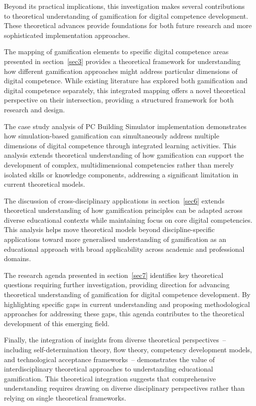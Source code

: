\documentclass[cte]{acnsart}
\begin{document}
Beyond its practical implications, this investigation makes several contributions to theoretical understanding of gamification for digital competence development. These theoretical advances provide foundations for both future research and more sophisticated implementation approaches.

The mapping of gamification elements to specific digital competence areas presented in section~\ref{sec3} provides a theoretical framework for understanding how different gamification approaches might address particular dimensions of digital competence. While existing literature has explored both gamification and digital competence separately, this integrated mapping offers a novel theoretical perspective on their intersection, providing a structured framework for both research and design.

The case study analysis of PC Building Simulator implementation demonstrates how simulation-based gamification can simultaneously address multiple dimensions of digital competence through integrated learning activities. This analysis extends theoretical understanding of how gamification can support the development of complex, multidimensional competencies rather than merely isolated skills or knowledge components, addressing a significant limitation in current theoretical models.

The discussion of cross-disciplinary applications in section~\ref{sec6} extends theoretical understanding of how gamification principles can be adapted across diverse educational contexts while maintaining focus on core digital competencies. This analysis helps move theoretical models beyond discipline-specific applications toward more generalised understanding of gamification as an educational approach with broad applicability across academic and professional domains.

The research agenda presented in section~\ref{sec7} identifies key theoretical questions requiring further investigation, providing direction for advancing theoretical understanding of gamification for digital competence development. By highlighting specific gaps in current understanding and proposing methodological approaches for addressing these gaps, this agenda contributes to the theoretical development of this emerging field.

Finally, the integration of insights from diverse theoretical perspectives~-- including self-determination theory, flow theory, competency development models, and technological acceptance frameworks~-- demonstrates the value of interdisciplinary theoretical approaches to understanding educational gamification. This theoretical integration suggests that comprehensive understanding requires drawing on diverse disciplinary perspectives rather than relying on single theoretical frameworks.
\end{document}
